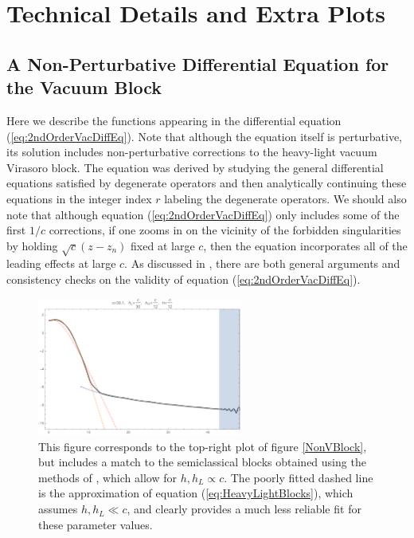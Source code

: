 \section{Technical Details and Extra Plots}

\subsection{A Non-Perturbative Differential Equation for the Vacuum Block}
\label{app:DiffEqforVac}

Here we describe the functions appearing in the differential equation (\ref{eq:2ndOrderVacDiffEq}).  Note that although the equation itself is perturbative, its solution includes non-perturbative corrections to the heavy-light vacuum Virasoro block.
The equation was derived \cite{Fitzpatrick:2016ive} by studying the general  differential equations satisfied by degenerate operators and then analytically continuing these equations in the integer index $r$ labeling the degenerate operators.  We should also note that although equation (\ref{eq:2ndOrderVacDiffEq}) only includes some of the first $1/c$ corrections, if one zooms in on the vicinity of the forbidden singularities by holding $\sqrt{c} (z-z_n)$ fixed at large $c$, then the equation incorporates all of the leading effects at large $c$.  As discussed in \cite{Fitzpatrick:2016ive}, there are both general arguments and consistency checks on the validity of equation (\ref{eq:2ndOrderVacDiffEq}).  

\begin{figure}
\centering{}\includegraphics[width=0.6\textwidth]{virasoro_chapter/NonVacSemiVSFull}
\caption{This figure corresponds to the top-right plot of figure \ref{NonVBlock}, but includes a match to the semiclassical blocks obtained using the methods of \cite{Fitzpatrick:2016mjq}, which allow for $h, h_L \propto c$.  The poorly fitted dashed line is the approximation of equation (\ref{eq:HeavyLightBlocks}), which assumes $h, h_L \ll c$, and clearly provides a much less reliable fit for these parameter values.}
\label{fig:NonVacSemiVSFull}
\end{figure}



